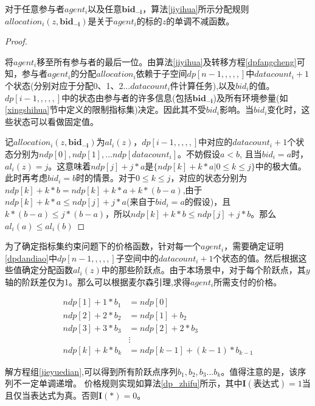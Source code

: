 \documentclass[promaster]{thesis-uestc}
\begin{document}
\begin{theorem}
对于任意参与者$agent_i$以及任意$\mathbf{bid_{-i}}$，算法\ref{jiyihua}所示分配规则$allocation_i(z,\mathbf{bid_{-i}})$是关于$agent_i$的标的$z$的单调不减函数。
\end{theorem}

\begin{proof}

\label{dpdandiao}

将$agent_i$移至所有参与者的最后一位。由算法\ref{jiyihua}及转移方程\ref{dpfangcheng}可知，参与者$agent_i$的分配$allocation_i$依赖于子空间$dp[n-1,,,,,]$中$datacount_i+1$个状态(分别对应于分配0、1、2...$datacount_i$件计算任务),以及$bid_i$的值。$dp[i-1,,,,,]$中的状态由参与者的许多信息(包括$\mathbf{bid_{-i}}$)及所有环境参量(如\ref{xingshihua}节中定义的限制指标集)决定。因此其不受$bid_i$影响。当$bid_i$变化时，这些状态可以看做固定值。

记$allocation_i(z,\mathbf{bid_{-i}})$为$al_i(z)$，$dp[i-1,,,,,]$中对应的$datacount_i+1$个状态分别为$ndp[0],ndp[1],...ndp[datacount_i]$。不妨假设$a < b$, 且当$bid_i = a$时，$al_i(z) = j$。这意味着$ndp[j]+j*a$是$\{ndp[k] + k*a|0 \leq k \leq j\}$中的极大值。此时再考虑$bid_i=b$时的情景。对于$ 0\leq k\leq j$，对应的状态分别为$ndp[k]+k*b=ndp[k]+k*a+k*(b-a)$,由于$ndp[k]+k*a\leq ndp[j]+j*a$(来自于$bid_i=a$的假设)，且$k*(b-a)\leq j*(b-a)$，所以$ndp[k]+k*b \leq ndp[j]+j*b$。那么$al_i(a)\leq al_i(b)$
\end{proof}

为了确定指标集约束问题下的价格函数，针对每一个$agent_i$，需要确定证明\ref{dpdandiao}中$dp[n-1,,,,,]$子空间中的$datacount_i+1$个状态的值。然后根据这些值确定分配函数$al_i(z)$中的那些阶跃点。由于本场景中，对于每个阶跃点，其$y$轴的阶跃差仅为1。那么可以根据麦尔森引理,求得$agent_i$所需支付的价格。

\begin{equation}
\label{jieyuedian}
 \begin{aligned}
 ndp[1]+1*b_1&=ndp[0]\\
 ndp[2]+2*b_2&=ndp[1]+b_2\\
 ndp[3]+3*b_3&=ndp[2]+2*b_3\\
 &\vdots\\
 ndp[k]+k*b_k&=ndp[k-1]+(k-1)*b_{k-1}
 \end{aligned}
\end{equation}

解方程组\ref{jieyuedian},可以得到所有阶跃点序列$b_1,b_2,b_3...b_k$。值得注意的是，该序列不一定单调递增。
价格规则实现如算法\ref{dp_zhifu}所示，其中$\mathbf{I}(\text{表达式}) = 1$当且仅当表达式为真。否则$\mathbf{I}(\text{*}) = 0$。
\end{document}
